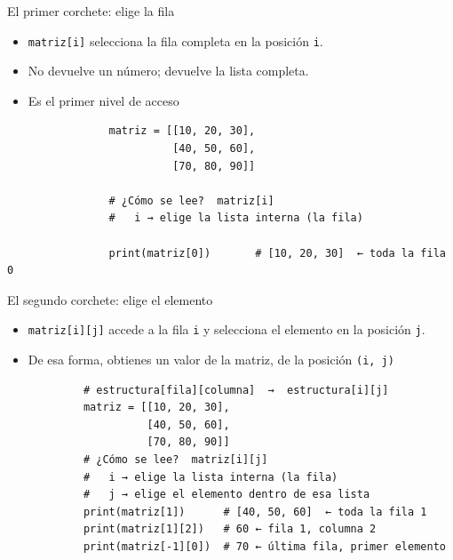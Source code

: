 \documentclass{beamer}
\begin{document}
    \begin{frame}[fragile, t]{El primer corchete: elige la fila}
        \begin{itemize}
            \item \texttt{matriz[i]} selecciona la fila completa en la posición \texttt{i}.
            \item No devuelve un número; devuelve la lista completa.
            \item Es el primer nivel de acceso
        \end{itemize}
        \begin{verbatim}
                matriz = [[10, 20, 30],
                          [40, 50, 60],
                          [70, 80, 90]]
                
                # ¿Cómo se lee?  matriz[i]
                #   i → elige la lista interna (la fila)
                
                print(matriz[0])       # [10, 20, 30]  ← toda la fila 0
        \end{verbatim}
    \end{frame}

    \begin{frame}[fragile, t]{El segundo corchete: elige el elemento}
        \begin{itemize}
            \item \texttt{matriz[i][j]} accede a la fila \texttt{i} y selecciona el elemento en la posición \texttt{j}.
            \item De esa forma, obtienes un valor de la matriz, de la posición \texttt{(i, j)}
        \end{itemize}
        \begin{verbatim}
            # estructura[fila][columna]  →  estructura[i][j]
            matriz = [[10, 20, 30],
                      [40, 50, 60],
                      [70, 80, 90]]
            # ¿Cómo se lee?  matriz[i][j]
            #   i → elige la lista interna (la fila)
            #   j → elige el elemento dentro de esa lista
            print(matriz[1])      # [40, 50, 60]  ← toda la fila 1
            print(matriz[1][2])   # 60 ← fila 1, columna 2
            print(matriz[-1][0])  # 70 ← última fila, primer elemento
            \end{verbatim}
    \end{frame}
\end{document}
